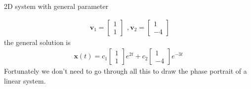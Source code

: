 \documentclass[9pt,aspectratio=43,mathserif,table]{beamer}
\begin{document}
\begin{frame}{2D system with general parameter}
\begin{multicols}{2}
    \begin{equation*}
      \begin{aligned}
        \symbf{v}_1 = 
        \begin{bmatrix}
          1\\
          1
        \end{bmatrix}
      \end{aligned}
      ,
        \symbf{v}_2 = 
        \begin{bmatrix}
          1\\
          -4
        \end{bmatrix}
    \end{equation*}
    the general solution is 
    \begin{equation*}
      \begin{aligned}
        \symbf{x}(t) = c_1
        \begin{bmatrix}
          1\\
          1
        \end{bmatrix}
        e^{2t}
        + c_2
        \begin{bmatrix}
          1\\
          -4
        \end{bmatrix}
        e^{-3t}
      \end{aligned}
    \end{equation*}
  Fortunately we don't need to go through all this to draw the phase portrait of a linear system.
  \end{multicols}
\end{frame}
\end{document}
